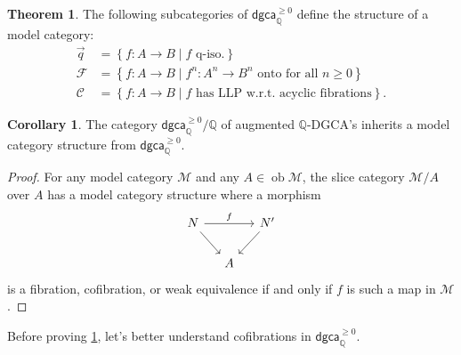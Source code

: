 \documentclass[10pt,letterpaper,cm]{nupset}
\theoremstyle{definition}
\theoremstyle{theorem}
\newtheorem{theorem}[defn]{Theorem}
\newtheorem{corollary}[defn]{Corollary}
\theoremstyle{remark}
\newcommand{\Q}{\mathbb Q}
\newcommand{\1}{\mathbb{1}}
\newcommand{\cf}{\mathscr{C}}
\newcommand{\f}{\mathscr{F}}
\newcommand{\q}{\vec q}
\newcommand{\m}{\mathcal{M}}
\newcommand{\dgca}{\mathsf{dgca}}
\newcommand{\0}{\vec 0}
\DeclareMathOperator{\ob}{ob}
\begin{document}
\begin{theorem}\label{dgcamod}
The following subcategories of $\dgca_{\Q}^{\geq 0}$ define the structure of a model category:
\begin{align*}
\q & = \left\{f : A \to B \mid \text{$f$ q-iso.}\right\}
\\ \f & = \left\{f : A \to B \mid \text{$f^n : A^n \to B^n$ onto for all $n\geq 0$}\right\}
\\ \cf & = \left\{f: A \to B \mid \text{$f$ has LLP w.r.t.\ acyclic fibrations}\right\}.
\end{align*}
\end{theorem}

\begin{corollary}
The category $\dgca_{\Q}^{\geq 0}/\Q$ of augmented $\Q$-DGCA's inherits a model category structure from $\dgca_{\Q}^{\geq 0}$.
\end{corollary}
\begin{proof}
For any model category $\m$ and any $A \in \ob{\m}$, the slice category $\m/A$ over $A$ has a model category structure where a morphism 
\[
\begin{tikzcd}[column sep =small]
	N & {} & N' \\
	& A
	\arrow[from=1-1, to=2-2]
	\arrow["f", from=1-1, to=1-3]
	\arrow[from=1-3, to=2-2]
\end{tikzcd}
\] is a fibration, cofibration, or weak equivalence if and only if $f$ is such a map in $\m$.
\end{proof}

Before proving \cref{dgcamod}, let's better understand cofibrations in $\dgca_{\Q}^{\geq 0}$.
\end{document}
